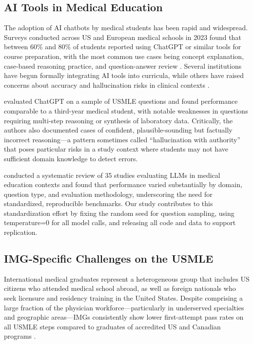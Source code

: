 \subsection{AI Tools in Medical Education}

The adoption of AI chatbots by medical students has been rapid and widespread. Surveys conducted across US and European medical schools in 2023 found that between 60\% and 80\% of students reported using ChatGPT or similar tools for course preparation, with the most common use cases being concept explanation, case-based reasoning practice, and question-answer review \parencite{huh2023medstudents, karabacak2023chatgptmed}. Several institutions have begun formally integrating AI tools into curricula, while others have raised concerns about accuracy and hallucination risks in clinical contexts \parencite{hartsfield2023chatgptmed}.

\textcite{kanjee2023chatgptusmle} evaluated ChatGPT on a sample of USMLE questions and found performance comparable to a third-year medical student, with notable weaknesses in questions requiring multi-step reasoning or synthesis of laboratory data. Critically, the authors also documented cases of confident, plausible-sounding but factually incorrect reasoning—a pattern sometimes called ``hallucination with authority'' that poses particular risks in a study context where students may not have sufficient domain knowledge to detect errors.

\textcite{chen2023llmmededucation} conducted a systematic review of 35 studies evaluating LLMs in medical education contexts and found that performance varied substantially by domain, question type, and evaluation methodology, underscoring the need for standardized, reproducible benchmarks. Our study contributes to this standardization effort by fixing the random seed for question sampling, using temperature=0 for all model calls, and releasing all code and data to support replication.

\subsection{IMG-Specific Challenges on the USMLE}

International medical graduates represent a heterogeneous group that includes US citizens who attended medical school abroad, as well as foreign nationals who seek licensure and residency training in the United States. Despite comprising a large fraction of the physician workforce—particularly in underserved specialties and geographic areas—IMGs consistently show lower first-attempt pass rates on all USMLE steps compared to graduates of accredited US and Canadian programs \parencite{ecfmg2023annual}.

